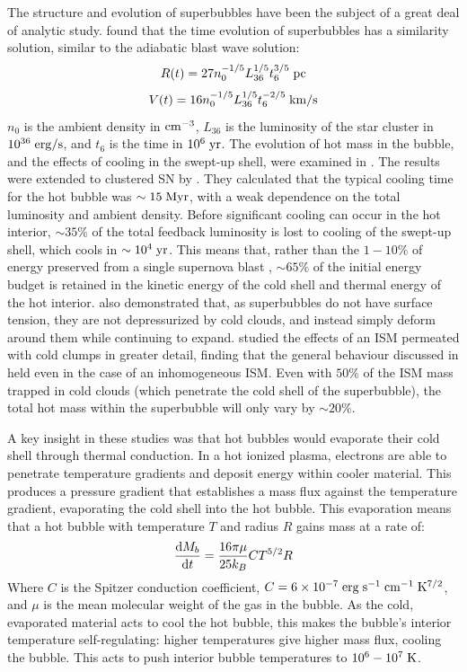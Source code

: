 The structure and evolution of superbubbles have been the subject of a great
deal of analytic study.  \citet{Castor1975} found that the time evolution of
superbubbles has a similarity solution, similar to the \citet{Sedov1959}
adiabatic blast wave solution: 
\begin{equation}
    R(t)=27n_0^{-1/5}L_{36}^{1/5}t_6^{3/5}\;\rm{pc} 
\end{equation}
\begin{equation}
    V(t)=16n_0^{-1/5}L_{36}^{1/5}t_6^{-2/5}\;\rm{km/s}
\end{equation}
$n_0$ is the ambient density in $\rm{cm^{-3}}$, $L_{36}$ is the luminosity of
the star cluster in $10^{36}\;\rm{erg/s}$, and $t_6$ is the time in
$10^6\;\rm{yr}$.  The evolution of hot mass in the bubble, and the effects of
cooling in the swept-up shell, were examined in \citet{Weaver1977}.  The
\citet{Weaver1977} results were extended to clustered SN by \citet{MacLow1988}.
They calculated that the typical cooling time for the hot bubble was
$\sim15\;\rm{Myr}$, with a weak dependence on the total luminosity and ambient
density.  Before significant cooling can occur in the hot interior, $\sim35\%$
of the total feedback luminosity is lost to cooling of the swept-up shell, which
cools in $\sim10^4\;\rm{yr}$.  This means that, rather than the $1-10\%$ of
energy preserved from a single supernova blast \citep{Chevalier1974}, $\sim65\%$
of the initial energy budget is retained in the kinetic energy of the cold shell
and thermal energy of the hot interior.  \citet{MacLow1988} also demonstrated
that, as superbubbles do not have surface tension, they are not depressurized by
cold clouds, and instead simply deform around them while continuing to expand.
\citet{Silich1996} studied the effects of an ISM permeated with cold clumps in
greater detail, finding that the general behaviour discussed in
\citet{MacLow1988} held even in the case of an inhomogeneous ISM.  Even with
$50\%$ of the ISM mass trapped in cold clouds (which penetrate the cold shell of
the superbubble), the total hot mass within the superbubble will only vary by
$\sim20\%$.

A key insight in these studies was that hot bubbles would evaporate their cold
shell through thermal conduction.  In a hot ionized plasma, electrons are able
to penetrate temperature gradients and deposit energy within cooler material.
This produces a pressure gradient that establishes a mass flux against the
temperature gradient, evaporating the cold shell into the hot bubble.  This
evaporation means that a hot bubble with temperature $T$ and radius $R$ gains
mass at a rate of:
\begin{equation}
    \frac{{\rm d }M_b}{{\rm d}t} = \frac{16\pi\mu}{25k_B} CT^{5/2}R
\end{equation}
Where $C$ is the Spitzer conduction coefficient,
$C=6\times10^{-7}\;\rm{erg\;s^{-1}\;cm^{-1}\;K^{7/2}}$, and $\mu$ is the mean
molecular weight of the gas in the bubble.  As the cold, evaporated material
acts to cool the hot bubble, this makes the bubble's interior temperature
self-regulating: higher temperatures give higher mass flux, cooling the bubble.
This acts to push interior bubble temperatures to $10^6-10^7\;\rm{K}$.


